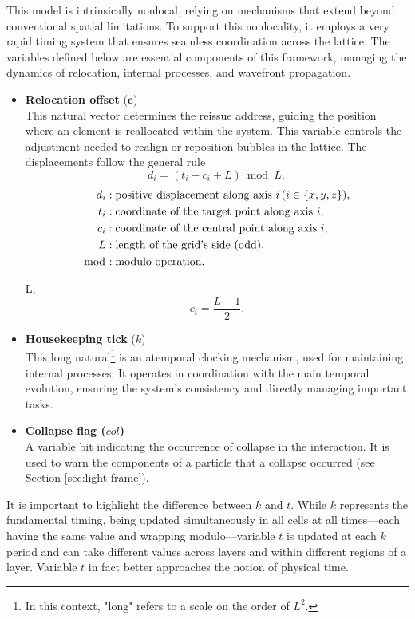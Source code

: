 \documentclass[12pt,english]{article}
\begin{document}
This model is intrinsically nonlocal, relying on mechanisms that extend beyond conventional spatial limitations. To support this nonlocality, it employs a very rapid timing system that ensures seamless coordination across the lattice. The variables defined below are essential components of this framework, managing the dynamics of relocation, internal processes, and wavefront propagation.
\begin{itemize}
    \item \textbf{Relocation offset} ($\textbf{c}$)\\
 This natural vector determines the reissue address, guiding the position where an element is reallocated within the system. This variable controls the adjustment needed to realign or reposition bubbles in the lattice. The displacements follow the general rule
 \[
d_i = (t_i - c_i + L) \bmod L,
\]
\begin{align*}
d_i & : \text{positive displacement along axis } i \, (i \in \{x, y, z\}), \\
t_i & : \text{coordinate of the target point along axis } i, \\
c_i & : \text{coordinate of the central point along axis } i, \\
L & : \text{length of the grid's side (odd)}, \\
\bmod & : \text{modulo operation}.
\end{align*}

 L, 
\[
c_i = \frac{L - 1}{2}.
\]

    \item \textbf{Housekeeping tick} ($k$)\\
 This long natural\footnote{In this context, "long" refers to a scale on the order of $L^2$.} is an atemporal clocking mechanism, used for maintaining internal processes. It operates in coordination with the main temporal evolution, ensuring the system's consistency and directly managing important tasks.
 
    \item \textbf{Collapse flag ($col$)} \\
    A variable bit indicating the occurrence of collapse in the interaction. It is used to warn the components of a particle that a collapse occurred (see Section \ref{sec:light-frame}).

\end{itemize}

It is important to highlight the difference between $k$ and $t$. While $k$ represents the fundamental timing, being updated simultaneously in all cells at all times—each having the same value and wrapping modulo—variable $t$ is updated at each $k$ period and can take different values across layers and within different regions of a layer. Variable $t$ in fact better approaches the notion of physical time.
\end{document}
